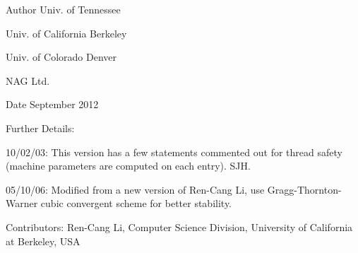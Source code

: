 \begin{DoxyAuthor}{Author}
Univ. of Tennessee 

Univ. of California Berkeley 

Univ. of Colorado Denver 

N\+A\+G Ltd. 
\end{DoxyAuthor}
\begin{DoxyDate}{Date}
September 2012 
\end{DoxyDate}
\begin{DoxyParagraph}{Further Details\+: }
\begin{DoxyVerb}  10/02/03: This version has a few statements commented out for thread
  safety (machine parameters are computed on each entry). SJH.

  05/10/06: Modified from a new version of Ren-Cang Li, use
     Gragg-Thornton-Warner cubic convergent scheme for better stability.\end{DoxyVerb}
 
\end{DoxyParagraph}
\begin{DoxyParagraph}{Contributors\+: }
Ren-\/\+Cang Li, Computer Science Division, University of California at Berkeley, U\+S\+A 
\end{DoxyParagraph}
